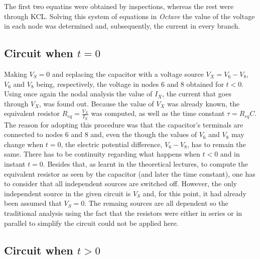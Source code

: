 The first two equatins were obtained by inspections, whereas the rest were through KCL.
Solving this system of equations in \textit{Octave} the value of the voltage in each node was determined and, subsequently, the current in every branch.






\subsection{Circuit when $t=0$}
Making $V_S=0$ and replacing the capacitor with a voltage source $V_X=V_6-V_8$, $V_6$ and $V_8$ being, respectively, the voltage in nodes 6 and 8 obtained for $t<0$.
Using once again the nodal analysis the value of $I_X$, the current that goes through $V_X$, was found out. Because the value of $V_X$ was already known, the equivalent resistor $R_{eq} = \frac{V_X}{I_X}$ was computed, as well as the time constant $\tau = R_{eq}C$.
The reason for adopting this procedure was that the capacitor's terminals are connected to nodes 6 and 8 and, even the though the values of $V_6$ and $V_8$ may change when $t=0$, the electric potential difference, $V_6-V_8$, has to remain the same. There has to be continuity regarding what happens when $t<0$ and in instant $t=0$. Besides that, as learnt in the theoretical lectures, to compute the equivalent resistor as seen by the capacitor (and later the time constant), one has to consider that all independent sources are switched off. However, the only independent source in the given circuit is $V_S$ and, for this point, it had already been assumed that $V_S=0$. The remaing sources are all dependent so the traditional analysis using the fact that the resistors were either in series or in parallel to simplify the circuit could not be applied here.



\subsection{Circuit when $t>0$}

\lipsum[1-1]


